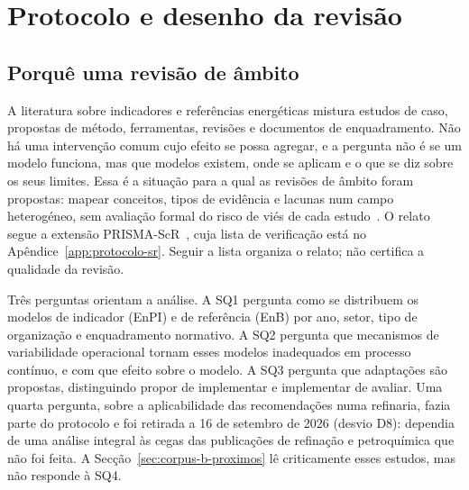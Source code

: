 

\section{Protocolo e desenho da revisão}
\label{sec:protocolo-sr}

\subsection{Porquê uma revisão de âmbito}

A literatura sobre indicadores e referências energéticas mistura estudos
de caso, propostas de método, ferramentas, revisões e documentos de
enquadramento. Não há uma intervenção comum cujo efeito se possa agregar,
e a pergunta não é se um modelo funciona, mas que modelos existem, onde
se aplicam e o que se diz sobre os seus limites. Essa é a situação para a
qual as revisões de âmbito foram propostas: mapear conceitos, tipos de
evidência e lacunas num campo heterogéneo, sem avaliação formal do risco
de viés de cada estudo~\cite{Arksey2005,Levac2010,Munn2018}. O relato segue
a extensão PRISMA-ScR~\cite{Tricco2018}, cuja lista de verificação está no
Apêndice~\ref{app:protocolo-sr}. Seguir a lista organiza o relato; não
certifica a qualidade da revisão.

Três perguntas orientam a análise. A SQ1 pergunta como se distribuem os
modelos de indicador (EnPI) e de referência (EnB) por ano, setor, tipo de
organização e enquadramento normativo. A SQ2 pergunta que mecanismos de
variabilidade operacional tornam esses modelos inadequados em processo
contínuo, e com que efeito sobre o modelo. A SQ3 pergunta que adaptações
são propostas, distinguindo propor de implementar e implementar de avaliar.
Uma quarta pergunta, sobre a aplicabilidade das recomendações numa
refinaria, fazia parte do protocolo e foi retirada a 16 de setembro de 2026
(desvio D8): dependia de uma análise integral às cegas das publicações de
refinação e petroquímica que não foi feita. A Secção~\ref{sec:corpus-b-proximos}
lê criticamente esses estudos, mas não responde à SQ4.

